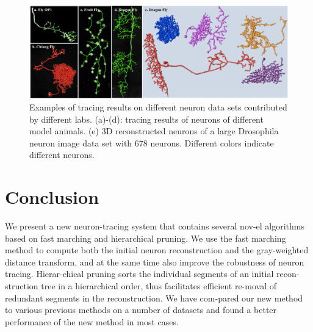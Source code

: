 \begin{figure}[htbp]
\centering
\includegraphics[width=1.0\textwidth]{images/autont_fig4}
\caption[Examples of tracing results on different neuron data sets contributed by different labs]{Examples of tracing results on different neuron data sets contributed by different labs. (a)-(d): tracing results of neurons of different model animals. (e) 3D reconstructed neurons of a large Drosophila neuron image data set with 678 neurons. Different colors indicate different neurons.}
\label{fig:autont-fig4}
\end{figure}

\section{Conclusion}
We present a new neuron-tracing system that contains several nov-el algorithms based on fast marching and hierarchical pruning. We use the fast marching method to compute both the initial neuron reconstruction and the gray-weighted distance transform, and at the same time also improve the robustness of neuron tracing. Hierar-chical pruning sorts the individual segments of an initial recon-struction tree in a hierarchical order, thus facilitates efficient re-moval of redundant segments in the reconstruction. We have com-pared our new method to various previous methods on a number of datasets and found a better performance of the new method in most cases. 
